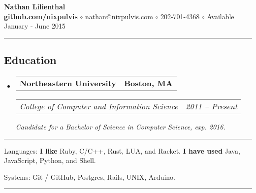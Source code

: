 \documentclass[10pt,letterpaper]{article}
\makeatletter
\newenvironment{indentsection}[1]
{\begin{list}{}
  {\setlength{\leftmargin}{#1}} \item[]
}
{\end{list}}
\newcommand{\headerrow}[2]
{\begin{tabular*}{\linewidth}{l@{\extracolsep{\fill}}r}
  #1 &
  #2 \\
\end{tabular*}}
\makeatother
\begin{document}
\begin{center}
  \huge \textbf{Nathan Lilienthal} \\
  \large
  {\bf github.com/nixpulvis}
  $\circ$
  nathan@nixpulvis.com
  $\circ$
  202-701-4368
  $\circ$
  Available January - June 2015
  \vspace{-0.2em}
\end{center}

\hrule
\vspace{-0.4em}
\subsection*{Education}
\begin{itemize}
  \parskip=0.1em

  \item
  \headerrow
    {\textbf{Northeastern University}}
    {\textbf{Boston, MA}}
  \headerrow
    {\emph{College of Computer and Information Science}}
    {\emph{2011 -- Present}}
    {\emph{Candidate for a Bachelor of Science in Computer Science, exp. 2016.}}
\end{itemize}


\hrule
\begin{indentsection}{\parindent}
\begin{description*}
  \item[Languages:]
  {\bf I like} Ruby, C/C++, Rust, LUA, and Racket. {\bf I have used} Java, JavaScript, Python, and Shell.
  \item[Systems:]
  Git / GitHub, Postgres, Rails, UNIX, Arduino.
\end{description*}
\end{indentsection}


\hrule
\vspace{-0.4em}
\end{document}
